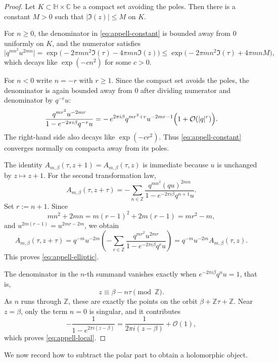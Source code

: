 \documentclass[12pt]{amsart}
\numberwithin{equation}{section}
\newcommand{\CC}{\mathbb C}
\newcommand{\HH}{\mathbb H}
\newcommand{\ZZ}{\mathbb Z}
\newcommand{\OO}{\mathcal O}
\begin{document}
\begin{proof}
Let $K\subset \HH\times\CC$ be a compact set avoiding the poles.  Then there is a constant $M>0$ such that $|\Im(z)|\leq M$ on $K$.

For $n\geq 0$, the denominator in \eqref{eq:appell-constant} is bounded away from $0$ uniformly on $K$, and the numerator satisfies
\[
\bigl|q^{mn^2}u^{2mn}\bigr|
=
\exp\bigl(-2\pi m n^2\Im(\tau)-4\pi mn\Im(z)\bigr)
\leq
\exp\bigl(-2\pi m n^2\Im(\tau)+4\pi mnM\bigr),
\]
which decays like $\exp(-c n^2)$ for some $c>0$.

For $n<0$ write $n=-r$ with $r\geq 1$.  Since the compact set avoids the poles, the denominator is again bounded away from $0$ after dividing numerator and denominator by $q^{-r}u$:
\[
\frac{q^{mr^2}u^{-2mr}}{1-e^{-2\pi i\beta}q^{-r}u}
=
-\,e^{2\pi i\beta}q^{mr^2+r}u^{-2mr-1}\Bigl(1+\OO(|q|^r)\Bigr).
\]
The right-hand side also decays like $\exp(-c r^2)$.  Thus \eqref{eq:appell-constant} converges normally on compacta away from its poles.

The identity $A_{m,\beta}(\tau,z+1)=A_{m,\beta}(\tau,z)$ is immediate because $u$ is unchanged by $z\mapsto z+1$.  For the second transformation law,
\[
A_{m,\beta}(\tau,z+\tau)
=
-\sum_{n\in\ZZ}\frac{q^{mn^2}(qu)^{2mn}}{1-e^{-2\pi i\beta}q^{n+1}u}.
\]
Set $r:=n+1$.  Since
\[
mn^2+2mn=m(r-1)^2+2m(r-1)=mr^2-m,
\]
and $u^{2m(r-1)}=u^{2mr-2m}$, we obtain
\[
A_{m,\beta}(\tau,z+\tau)
=
q^{-m}u^{-2m}
\left(-\sum_{r\in\ZZ}\frac{q^{mr^2}u^{2mr}}{1-e^{-2\pi i\beta}q^ru}\right)
=
q^{-m}u^{-2m}A_{m,\beta}(\tau,z).
\]
This proves \eqref{eq:appell-elliptic}.

The denominator in the $n$-th summand vanishes exactly when
$e^{-2\pi i\beta}q^n u=1$,
that is,
\[
z\equiv \beta-n\tau \pmod{\ZZ}.
\]
As $n$ runs through $\ZZ$, these are exactly the points on the orbit $\beta+\ZZ\tau+\ZZ$.  Near $z=\beta$, only the term $n=0$ is singular, and it contributes
\[
-\frac{1}{1-e^{2\pi i(z-\beta)}}
=
\frac{1}{2\pi i(z-\beta)}+\OO(1),
\]
which proves \eqref{eq:appell-local}.
\end{proof}

We now record how to subtract the polar part to obtain a holomorphic object.
\end{document}
